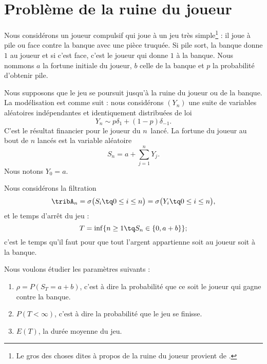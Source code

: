 \section{Problème de la ruine du joueur}
\label{SecMSOjfgM}

Nous considérons un joueur compulsif qui joue à un jeu très simple\footnote{Le gros des choses dites à propos de la ruine du joueur provient de \cite{KXjFWKA}.} : il joue à pile ou face contre la banque avec une pièce truquée. Si pile sort, la banque donne \( 1\) au joueur et si c'est face, c'est le joueur qui donne \( 1\) à la banque. Nous nommons \( a\) la fortune initiale du joueur,  \( b\) celle de la banque et \( p\) la probabilité d'obtenir pile.

Nous supposons que le jeu se poursuit jusqu'à la ruine du joueur ou de la banque. La modélisation est comme suit : nous considérons \( (Y_n)\) une suite de variables aléatoires indépendantes et identiquement distribuées de loi
\begin{equation}
    Y_n\sim p\delta_1+(1-p)\delta_{-1}.
\end{equation}
C'est le résultat financier pour le joueur du \( n\)\ieme\ lancé. La fortune du joueur au bout de \( n\) lancés est la variable aléatoire
\begin{equation}
    S_n=a+\sum_{j=1}^nY_j.
\end{equation}
Nous notons \( Y_0=a\).

Nous considérons la filtration
\begin{equation}
    \tribA_n=\sigma\big( S_i\tq 0\leq i\leq n \big)=\sigma\big( Y_i\tq 0\leq i\leq n \big),
\end{equation}
et le temps d'arrêt du jeu :
\begin{equation}
    T=\inf\{ n\geq 1\tq S_n\in\{ 0,a+b \} \};
\end{equation}
c'est le temps qu'il faut pour que tout l'argent appartienne soit au joueur soit à la banque.

Nous voulons étudier les paramètres suivants :
\begin{enumerate}
    \item
        \( \rho=P(S_T=a+b)\), c'est à dire la probabilité que ce soit le joueur qui gagne contre la banque.
    \item
        \( P(T<\infty)\), c'est à dire la probabilité que le jeu se finisse.
    \item
        \( E(T)\), la durée moyenne du jeu.
\end{enumerate}

